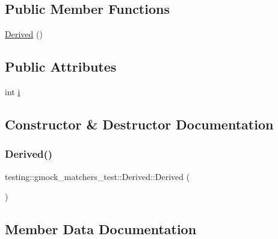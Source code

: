 \subsection*{Public Member Functions}
\begin{DoxyCompactItemize}
\item 
\hyperlink{classtesting_1_1gmock__matchers__test_1_1_derived_a3de17d9e4bfb19dcafb88d3cccbbeaf2}{Derived} ()
\end{DoxyCompactItemize}
\subsection*{Public Attributes}
\begin{DoxyCompactItemize}
\item 
int \hyperlink{classtesting_1_1gmock__matchers__test_1_1_derived_a357d6747c44d7af7159fb5898a782f1b}{i}
\end{DoxyCompactItemize}


\subsection{Constructor \& Destructor Documentation}
\mbox{\label{classtesting_1_1gmock__matchers__test_1_1_derived_a3de17d9e4bfb19dcafb88d3cccbbeaf2}} 
\subsubsection{\texorpdfstring{Derived()}{Derived()}}
{\footnotesize\ttfamily testing\+::gmock\+\_\+matchers\+\_\+test\+::\+Derived\+::\+Derived (\begin{DoxyParamCaption}{ }\end{DoxyParamCaption})\hspace{0.3cm}{\ttfamily [inline]}}



\subsection{Member Data Documentation}
\mbox{\label{classtesting_1_1gmock__matchers__test_1_1_derived_a357d6747c44d7af7159fb5898a782f1b}} 
